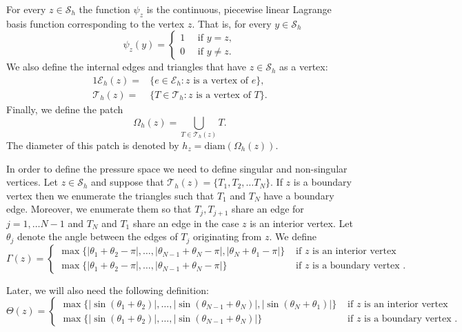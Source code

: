 \documentclass[11pt]{amsart}
\numberwithin{equation}{section}
\newcommand{\Eh}{\mathcal{E}_h}
\newcommand{\Sh}{\mathcal{S}_h}
\newcommand{\Th}{\mathcal{T}_h}
\theoremstyle{definition}
\begin{document}
For every $z \in \Sh$ the function $\psi_z$  is the continuous, piecewise linear 
Lagrange basis function corresponding to the vertex $z$. That is, for every $y \in \Sh$
\begin{equation}\label{eqn:weneedthis}
 \psi_z(y)= 
\begin{cases}
1 \quad \text{ if } y=z,\\
0 \quad \text{ if } y \not=z. 
\end{cases}
\end{equation}
We also define the internal edges and triangles that have $z \in \Sh$ as a vertex:
\begin{alignat*}{1}
\Eh(z)=&\{ e \in \Eh: z \text{ is a vertex of } e \}, \\
\Th(z)=&\{ T \in \Th: z \text{ is a vertex of } T \}.  
\end{alignat*}
Finally, we define the patch
\begin{equation*}
\Omega_h(z)= \bigcup_{T \in \Th(z)} T.
\end{equation*}
The diameter of this patch is denoted by $h_z= \text{diam}(\Omega_h(z))$.



In order to define the pressure space we need to define singular and non-singular vertices. 
Let $z \in \Sh$  and suppose that $\Th(z)=\{ T_1, T_2, \ldots T_N \}$. If $z$ is a boundary vertex then we enumerate the triangles such that $T_1$ and  $T_N$ have a boundary edge.  Moreover, we enumerate them so that $T_j, T_{j+1}$ share an edge for $j=1, \ldots N-1$ and  $T_N$ and $T_1$ share an edge in the case $z$ is an interior vertex. Let $\theta_j $ denote the angle between the edges of $T_j$ originating from $z$.   We define 
\[
\Gamma(z)= 
\begin{cases}
\max \{ |\theta_1+\theta_{2}- \pi|,  \ldots, |\theta_{N-1}+\theta_{N}- \pi|, |\theta_N+\theta_1-\pi|\} & \text{ if }  z \text{ is an interior vertex } \\
\max \{ |\theta_1+\theta_{2}- \pi|,   \ldots, |\theta_{N-1}+\theta_{N}- \pi| \} & \text{ if }  z \text{ is a boundary vertex }.
\end{cases}
\]

Later, we will also need the following definition:
\[
\Theta(z)= 
\begin{cases}
\max \{ |\sin(\theta_1+\theta_{2})|,  \ldots, |\sin(\theta_{N-1}+\theta_{N})|, |\sin(\theta_N+\theta_1)| \}& \text{ if }  z \text{ is an interior vertex } \\
\max \{ |\sin(\theta_1+\theta_{2})|,  \ldots, |\sin(\theta_{N-1}+\theta_{N})| \} & \text{ if }  z \text{ is a boundary vertex }.
\end{cases}
\]
\end{document}
